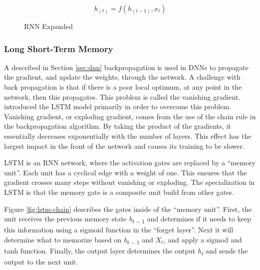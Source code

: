 \documentclass[11pt]{article}
\begin{document}
\begin{equation}
\label{eq:rnn-state-update}
h_{\left(t\right)}=f\left(h_{\left(t-1\right)},x_t\right)
\end{equation}

\begin{figure}[!ht]
	\centering
	\caption{RNN Expanded\cite{Olah2015UnderstandingBlog}}
	\label{fig:rnn-unrolled}
\end{figure}

\subsubsection{Long Short-Term Memory} \label{sec:lstm}

A described in Section \ref{sec:dnn} backpropagation is used in DNNs to propagate the gradient, and update the weights, through the network. A challenge with back propagation is that if there is a poor local optimum, at any point in the network, then this propagates. This problem is called the vanishing gradient. \citet{Hochreiter1997LONGMEMORY} introduced the LSTM model primarily in order to overcome this problem. Vanishing gradient, or exploding gradient, comes from the use of the chain rule in the backpropagation algorithm. By taking the product of the gradients, it essentially decreases exponentially with the number of layers. This effect has the largest impact in the front of the network and causes its training to be slower.

LSTM is an RNN network, where the activation gates are replaced by a ``memory unit''. Each unit has a cyclical edge with a weight of one. This ensures that the gradient crosses many steps without vanishing or exploding. The specialization in LSTM is that the memory gate is a composite unit build from other gates.

Figure \ref{fig:lstm-chain} describes the gates inside of the ``memory unit''. First, the unit receives the previous memory state \textit{h\textsubscript{\(t-1\)}} and determines if it needs to keep this information using a sigmoid function in the ``forget layer''. Next it will determine what to memorize based on \textit{h\textsubscript{\(t-1\)}} and \textit{\(X_t\)}, and apply a sigmod and tanh function. Finally, the output layer determines the output \textit{h\textsubscript{t}} and sends the output to the next unit.
\end{document}
